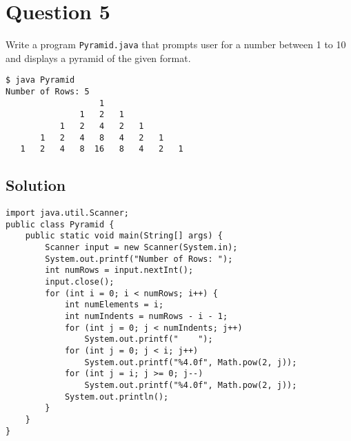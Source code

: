 \section*{Question 5}
Write a program \texttt{Pyramid.java} that prompts user for a number between 1 to 10 and displays a pyramid of the given format.

\begin{verbatim}
$ java Pyramid
Number of Rows: 5
                   1
               1   2   1
           1   2   4   2   1
       1   2   4   8   4   2   1
   1   2   4   8  16   8   4   2   1
\end{verbatim}

\subsection*{Solution}
\lstset{language=Java,tabsize=2}
\begin{lstlisting}
import java.util.Scanner;
public class Pyramid {
	public static void main(String[] args) {
		Scanner input = new Scanner(System.in);
		System.out.printf("Number of Rows: ");
		int numRows = input.nextInt();
		input.close();
		for (int i = 0; i < numRows; i++) {
			int numElements = i;
			int numIndents = numRows - i - 1;
			for (int j = 0; j < numIndents; j++)
				System.out.printf("    ");
			for (int j = 0; j < i; j++)
				System.out.printf("%4.0f", Math.pow(2, j));
			for (int j = i; j >= 0; j--)
				System.out.printf("%4.0f", Math.pow(2, j));
			System.out.println();
		}
	}
}
\end{lstlisting}
